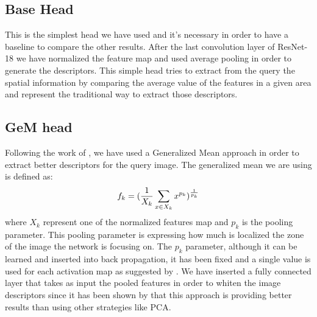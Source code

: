 \documentclass[10pt,twocolumn,letterpaper]{article}
\begin{document}
	\subsection{Base Head}
	This is the simplest head we have used and it's necessary in order to have a baseline to compare the other
	results. After the last convolution layer of ResNet-18 we have normalized the feature map and used average 
	pooling in order to generate the descriptors. This simple head tries to extract from the query the spatial
	information by comparing the average value of the features in a given area and represent the traditional way 
	to extract those descriptors.
	
	\subsection{GeM head}
	Following the work of \cite{GEM}, we have used a Generalized Mean approach in order to extract better 
	descriptors for the query image. The generalized mean we are using is defined as:
	\begin{equation}
		f_k = ({{1}\over{X_k}} \sum_{x \in X_k} x^{p_k} ) ^ {1\over{p_k}}
	\end{equation}
	where $X_k $ represent one of the normalized features map and $p_k $ is the pooling parameter. This 
	pooling parameter is expressing how much is localized the zone of the image the network is focusing on.
	The $p_k $ parameter, although it can be learned and inserted into back propagation, it has been fixed
	and a single value is used for each activation map as suggested by \cite{GEM}. We have
	inserted a fully connected layer that takes as input the pooled features in order to whiten the image
	descriptors since it has been shown by \cite{GEM} that this approach is providing better results than
	using other strategies like PCA.
	
\end{document}
